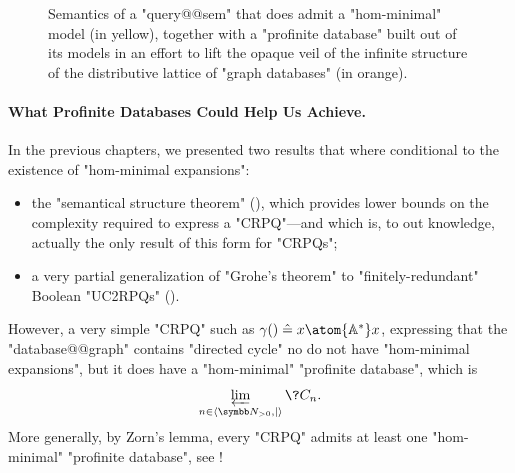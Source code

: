 \begin{figure}
	\centering
	\caption{\AP\label{fig:poset-reldb-profinite}
	Semantics of a "query@@sem" that does admit a "hom-minimal" model
	(in yellow),
	together with a "profinite database" built out of its models
	in an effort to lift the opaque veil of the infinite structure of the distributive lattice
	of "graph databases" (in orange).
	}
\end{figure}

\paragraph{What Profinite Databases Could Help Us Achieve.}
In the previous chapters, we presented two results that where conditional
to the existence of "hom-minimal expansions":
\begin{itemize}
	\item the "semantical structure theorem" (), which
		provides lower bounds on the complexity required to express a "CRPQ"---and which is,
		to out knowledge, actually the only result of this form for "CRPQs";
	\item a very partial generalization of "Grohe's theorem" to
		"finitely-redundant" Boolean "UC2RPQs" ().
\end{itemize}
However, a very simple "CRPQ" such as $\gamma() \defeq x \atom{\A^*} x$,
expressing that the "database@@graph" contains "directed cycle" no do not
have "hom-minimal expansions", but it does have a "hom-minimal" 
"profinite database", which is \[\varprojlim\limits_{n\in\tup{\Np,\mid}} \?C_{n}.\]
More generally, by Zorn's lemma, every "CRPQ" admits at least 
one "hom-minimal" "profinite database", see !

